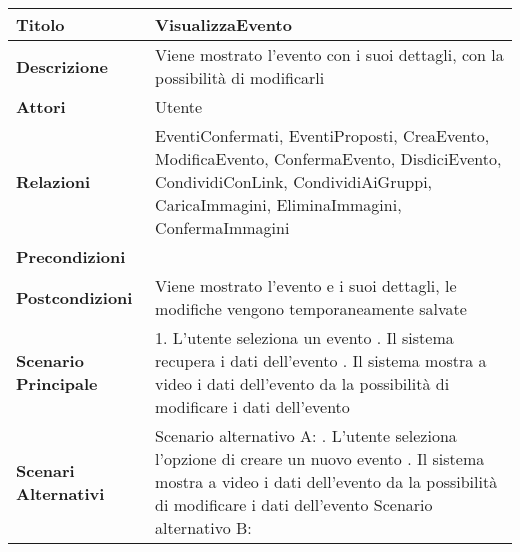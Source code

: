 \begin{tabular} {|P{4.5cm}|P{11cm}|}
  \hline
  \textbf{Titolo}                   & VisualizzaEvento                                                                                                                                                                                   \\
  \hline
  \textbf{Descrizione}              & Viene mostrato l'evento con i suoi dettagli, con la possibilità di modificarli                                                                                                                     \\
  \hline
  \textbf{Attori}                   & Utente                                                                                                                                                                                             \\
  \hline
  \textbf{Relazioni}                & EventiConfermati, EventiProposti, CreaEvento, ModificaEvento, ConfermaEvento, DisdiciEvento, CondividiConLink, CondividiAiGruppi, CaricaImmagini, EliminaImmagini, ConfermaImmagini                \\
  \hline
  \textbf{Precondizioni}            &                                                                                                                                                                                                    \\
  \hline
  \textbf{Postcondizioni}           & Viene mostrato l'evento e i suoi dettagli, le modifiche vengono temporaneamente salvate                                                                                                            \\
  \hline
  \textbf{Scenario Principale}      & 1. L'utente seleziona un evento . Il sistema recupera i dati dell'evento . Il sistema mostra a video i dati dell'evento da la possibilità di modificare i dati dell'evento \\
  \hline
  \textbf{Scenari Alternativi}      & Scenario alternativo A: . L'utente seleziona l'opzione di creare un nuovo evento . Il sistema mostra a video i dati dell'evento da la possibilità di modificare i dati dell'evento         \linebreak
  Scenario alternativo B:\linebreak

\end{tabular}
